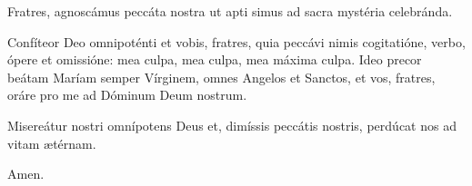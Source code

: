 \Vbardot{} Fratres, agnoscámus peccáta nostra ut apti simus ad sacra mystéria celebránda.

\mbox{}

Confíteor Deo omnipoténti et vobis, fratres, quia peccávi nimis cogitatióne, verbo, ópere et omissióne: 
mea culpa, mea culpa, mea máxima culpa. 
Ideo precor beátam Maríam semper Vírginem, 
omnes Angelos et Sanctos, et vos, fratres, 
oráre pro me ad Dóminum Deum nostrum.

\Vbardot{} Misereátur nostri omnípotens Deus et, dimíssis peccátis nostris, perdúcat nos ad vitam ætérnam.

\Rbardot{} Amen.
